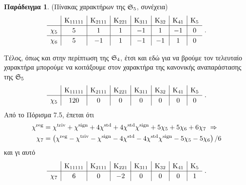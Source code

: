 \documentclass[12pt,a4paper,reqno]{amsart}
\theoremstyle{definition}
\newtheorem*{example}{Παράδειγμα}
\begin{document}
\begin{example}{\rm(Πίνακας χαρακτήρων της $\mathfrak{S}_5$, συνέχεια)}
    \[
    \renewcommand{\arraystretch}{1.2} 
    \begin{array}{c|c|c|c|c|c|c|c}
           & \rmK_{11111} & \rmK_{2111} & \rmK_{221} & \rmK_{311} & \rmK_{32}  & \rmK_{41} & \rmK_5        \\ \hline
    \chi_5 & 5            & 1           & 1          & -1         & 1          & -1        & 0  \\ \hline
    \chi_6 & 5            & -1          & 1          & -1         & -1         & 1         & 0  
    \end{array} \ .
    \]

    Τέλος, όπως και στην περίπτωση της $\mathfrak{S}_4$, έτσι και εδώ για να βρούμε τον τελευταίο χαρακτήρα μπορούμε να κοιτάξουμε στον χαρακτήρα της κανονικής αναπαράστασης της $\mathfrak{S}_5$
    \[
    \renewcommand{\arraystretch}{1.2} 
    \begin{array}{c|c|c|c|c|c|c|c}
           & \rmK_{11111} & \rmK_{2111} & \rmK_{221} & \rmK_{311} & \rmK_{32} & \rmK_{41} & \rmK_5        \\ \hline
    \chi_5 & 120          & 0           & 0          & 0          & 0         & 0         & 0  
    \end{array} \ .
    \]
    Από το Πόρισμα 7.5, έπεται ότι 
    \begin{align*}
    \chi^{\mathrm{reg}} &= \chi^{\mathrm{triv}} + \chi^{\mathrm{sign}} + 4\chi^{\mathrm{std}} + 4\chi^{\mathrm{std}}\chi^{\mathrm{sign}} + 5\chi_5 + 5\chi_6 + 6\chi_7 \ \Rightarrow \\ 
    \chi_7 &= \left(\chi^{\mathrm{reg}} - \chi^{\mathrm{triv}} - \chi^{\mathrm{sign}} - 4\chi^{\mathrm{std}} - 4\chi^{\mathrm{std}}\chi^{\mathrm{sign}} - 5\chi_5 - 5\chi_6\right)/6
    \end{align*}
    και γι αυτό 
    \[
    \renewcommand{\arraystretch}{1.2} 
    \begin{array}{c|c|c|c|c|c|c|c}
           & \rmK_{11111} & \rmK_{2111} & \rmK_{221} & \rmK_{311} & \rmK_{32} & \rmK_{41} & \rmK_5        \\ \hline
    \chi_7 & 6            & 0           & -2         & 0          & 0         & 0         & 1  
    \end{array} \ .
    \]


\end{example}
\end{document}

